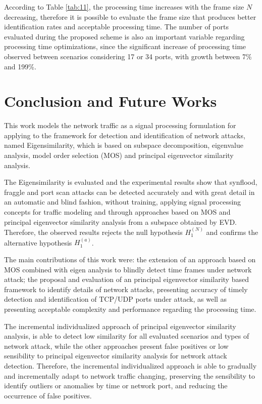 According to Table \ref{tab:11}, the processing time increases with the frame size $N$ decreasing, therefore it is possible to evaluate the frame size that produces better identification rates and acceptable processing time. The number of ports evaluated during the proposed scheme is also an important variable regarding processing time optimizations, since the significant increase of processing time observed between scenarios considering 17 or 34 ports, with growth between 7\% and 199\%.


\section{Conclusion and Future Works}
\label{sec:2_conclusionandfutureworks}

This work models the network traffic as a signal processing formulation for applying to the framework for detection and identification of network attacks, named Eigensimilarity, which is based on subspace decomposition, eigenvalue analysis, model order selection (MOS) and principal eigenvector similarity analysis.

The Eigensimilarity is evaluated and the experimental results show that synflood, fraggle and port scan attacks can be detected accurately and with great detail in an automatic and blind fashion, without training, applying signal processing concepts for traffic modeling and through approaches based on MOS and principal eigenvector similarity analysis from a subspace obtained by EVD. Therefore, the observed results rejects the null hypothesis $H_1^{(N)}$ and confirms the alternative
hypothesis $H_1^{(a)}$.

The main contributions of this work were: the extension of an approach based on MOS combined with eigen analysis to blindly detect time frames under network attack; the proposal and evaluation of an principal eigenvector similarity based framework to identify details of network attacks, presenting accuracy of timely detection and identification of TCP/UDP ports under attack, as well as presenting acceptable complexity and performance regarding the processing time.

The incremental individualized approach of principal eigenvector similarity analysis, is able to detect low similarity for all evaluated scenarios and types of network attack, while the other approaches present false positives or low sensibility to principal eigenvector similarity analysis for network attack detection. Therefore, the incremental individualized approach is able to gradually and incrementally adapt to network traffic changing, preserving the sensibility to identify outliers or anomalies by time or network port, and reducing the occurrence of false positives.

